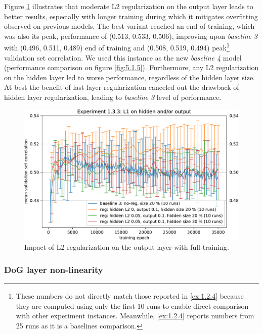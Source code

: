 Figure \ref{fig:5.1.3.3} illustrates that moderate L2 regularization on the output layer leads to better results, especially with longer training during which it mitigates overfitting observed on previous models. The best variant reached an end of training, which was also its peak, performance of (0.513, 0.533, 0.506), improving upon \textit{baseline 3} with (0.496, 0.511, 0.489) end of training and (0.508, 0.519, 0.494) peak\footnote{These numbers do not directly match those reported in \ref{ex:1.2.4} because they are computed using only the first 10 runs to enable direct comparison with other experiment instances. Meanwhile, \ref{ex:1.2.4} reports numbers from 25 runs as it is a baselines comparison.} validation set correlation. We used this instance as the new \textit{baseline 4} model (performance comparison on figure \ref{fig:5.1.5}). Furthermore, any L2 regularization on the hidden layer led to worse performance, regardless of the hidden layer size. At best the benefit of last layer regularization canceled out the drawback of hidden layer regularization, leading to \textit{baseline 3} level of performance.

\begin{figure}[H]
    \centering
    \includegraphics[width=1\textwidth]{../figures/05_1_3_3}
    \caption[Experiment 1.3.3]{Impact of L2 regularization on the output layer with full training.}
    \label{fig:5.1.3.3}
\end{figure}

\subsubsection{DoG layer non-linearity}\label{ex:1.3.4}

